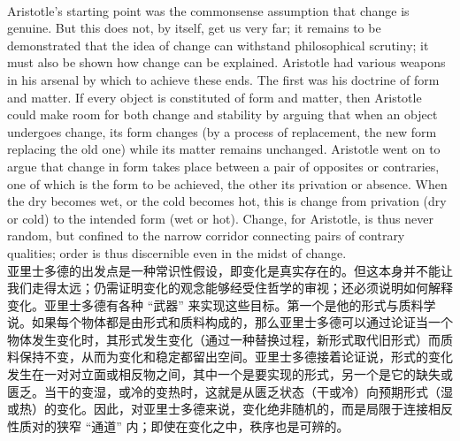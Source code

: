 \documentclass{article}
\begin{document}
\\
Aristotle’s starting point was the commonsense assumption that change is genuine. But this does not, by itself, get us very far; it remains to be demonstrated that the idea of change can withstand philosophical scrutiny; it must also be shown how change can be explained. Aristotle had various weapons in his arsenal by which to achieve these ends. The first was his doctrine of form and matter. If every object is constituted of form and matter, then Aristotle could make room for both change and stability by arguing that when an object undergoes change, its form changes (by a process of replacement, the new form replacing the old one) while its matter remains unchanged. Aristotle went on to argue that change in form takes place between a pair of opposites or contraries, one of which is the form to be achieved, the other its privation or absence. When the dry becomes wet, or the cold becomes hot, this is change from privation (dry or cold) to the intended form (wet or hot). Change, for Aristotle, is thus never random, but confined to the narrow corridor connecting pairs of contrary qualities; order is thus discernible even in the midst of change.\\
亚里士多德的出发点是一种常识性假设，即变化是真实存在的。但这本身并不能让我们走得太远；仍需证明变化的观念能够经受住哲学的审视；还必须说明如何解释变化。亚里士多德有各种 “武器” 来实现这些目标。第一个是他的形式与质料学说。如果每个物体都是由形式和质料构成的，那么亚里士多德可以通过论证当一个物体发生变化时，其形式发生变化（通过一种替换过程，新形式取代旧形式）而质料保持不变，从而为变化和稳定都留出空间。亚里士多德接着论证说，形式的变化发生在一对对立面或相反物之间，其中一个是要实现的形式，另一个是它的缺失或匮乏。当干的变湿，或冷的变热时，这就是从匮乏状态（干或冷）向预期形式（湿或热）的变化。因此，对亚里士多德来说，变化绝非随机的，而是局限于连接相反性质对的狭窄 “通道” 内；即使在变化之中，秩序也是可辨的。\\
\end{document}
